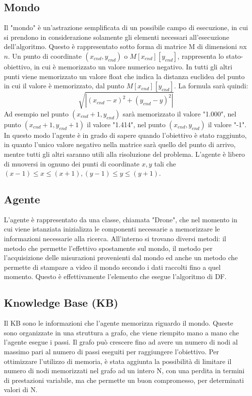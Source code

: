 \subsection{Mondo}
Il "mondo" è un'astrazione semplificata di un possibile campo di esecuzione, in cui si prendono in considerazione solamente gli elementi necessari all'esecuzione dell'algoritmo. Questo è rappresentato sotto forma di matrice M di dimensioni $n$x$n$. Un punto di coordinate $(x_{end}, y_{end})$ o $M[x_{end}][y_{end}]$, rappresenta lo stato-obiettivo, in cui è memorizzato un valore numerico negativo. In tutti gli altri punti viene memorizzato un valore float che indica la distanza euclidea del punto in cui il valore è memorizzato, dal punto $M[x_{end}][y_{end}]$. La formula sarà quindi:
$$\sqrt{|(x_{end} - x)^2 + (y_{end} - y)^2|}$$
Ad esempio nel punto $(x_{end}+1, y_{end})$ sarà memorizzato il valore "1.000", nel punto $(x_{end}+1, y_{end}+1)$ il valore "1.414", nel punto $(x_{end}, y_{end})$ il valore "-1". In questo modo l'agente è in grado di sapere quando l'obiettivo è stato raggiunto, in quanto l'unico valore negativo nella matrice sarà quello del punto di arrivo, mentre tutti gli altri saranno utili alla risoluzione del problema.
L'agente è libero di muoversi in ognuno dei punti di coordinate $ x, y $ tali che $ (x-1) \le x \le (x+1), (y-1) \le y \le (y+1) $.

\subsection{Agente}
L'agente è rappresentato da una classe, chiamata "Drone", che nel momento in cui viene istanziata inizializza le componenti necessarie a memorizzare le informazioni necessarie alla ricerca. All'interno si trovano diversi metodi: il metodo che permette l'effettivo spostamente sul mondo, il metodo per l'acquisizione delle misurazioni provenienti dal mondo ed anche un metodo che permette di stampare a video il mondo secondo i dati raccolti fino a quel momento. Questo è effettivamente l'elemento che esegue l'algoritmo di DF.

\subsection{Knowledge Base (KB)}
Il KB sono le informazioni che l'agente memorizza riguardo il mondo. Queste sono organizzate in una struttura a grafo, che viene riempito mano a mano che l'agente esegue i passi. Il grafo può crescere fino ad avere un numero di nodi al massimo pari al numero di passi eseguiti per raggiungere l'obiettivo. Per ottimizzare l'utilizzo di memoria, è stata aggiunta la possibilità di limitare il numero di nodi memorizzati nel grafo ad un intero N, con una perdita in termini di prestazioni variabile, ma che permette un buon compromesso, per determinati valori di N.

